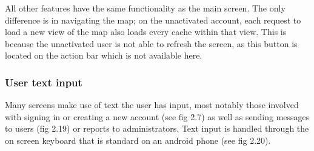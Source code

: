 All other features have the same functionality as the main screen. The only difference is in navigating the map; on the unactivated account, each request to load a new view of the map also loads every cache within that view. This is because the unactivated user is not able to refresh the screen, as this button is located on the action bar which is not available here.

\subsubsection{User text input}

Many screens make use of text the user has input, most notably those involved with signing in or creating a new account (see fig 2.7) as well as sending messages to users (fig 2.19) or reports to administrators. Text input is handled through the on screen keyboard that is standard on an android phone (see fig 2.20). 
\vspace{0pt}
